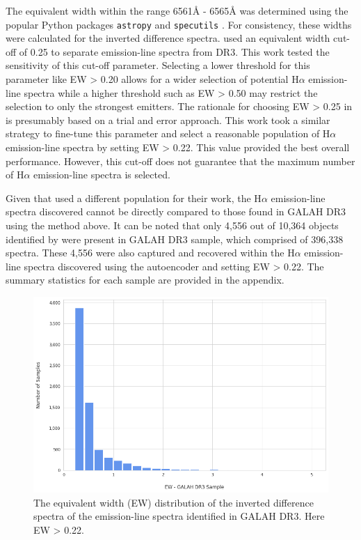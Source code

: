 The equivalent width within the range 6561\r{A} - 6565\r{A} was determined using the popular Python packages \texttt{astropy} \citep{astropy:2018, astropy:2013} and \texttt{specutils} \citep{specutils}. For consistency, these widths were calculated for the inverted difference spectra. \citet{vcotar2021galah} used an equivalent width cut-off of 0.25 to separate emission-line spectra from DR3. This work tested the sensitivity of this cut-off parameter. Selecting a lower threshold for this parameter like EW > 0.20 allows for a wider selection of potential H$\alpha$ emission-line spectra while a higher threshold such as EW > 0.50 may restrict the selection to only the strongest emitters. The rationale for choosing EW > 0.25 in \citet{vcotar2021galah} is presumably based on a trial and error approach. This work took a similar strategy to fine-tune this parameter and select a reasonable population of H$\alpha$ emission-line spectra by setting EW > 0.22. This value provided the best overall performance. However, this cut-off does not guarantee that the maximum number of H$\alpha$ emission-line spectra is selected. 

Given that \citet{vcotar2021galah} used a different population for their work, the H$\alpha$ emission-line spectra discovered cannot be directly compared to those found in GALAH DR3 using the method above. It can be noted that only 4,556 out of 10,364 objects identified by \citet{vcotar2021galah} were present in GALAH DR3 sample, which comprised of 396,338 spectra. These 4,556 were also captured and recovered within the H$\alpha$ emission-line spectra discovered using the autoencoder and setting EW > 0.22. The summary statistics for each sample are provided in the appendix.

\begin{figure}[!htb]
\centering
\includegraphics[scale=0.50]{figures/EW hist.png}
\caption{The equivalent width (EW) distribution of the inverted difference spectra of the emission-line spectra identified in GALAH DR3. Here EW > 0.22.}
\end{figure}


